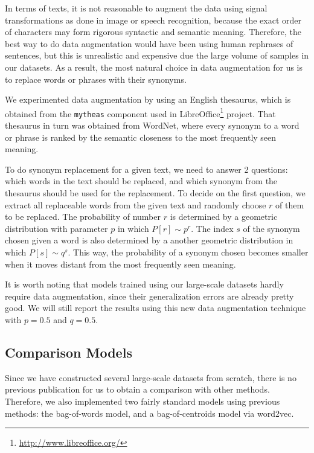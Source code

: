 \documentclass{article}
\begin{document}
\begin{CJK}{UTF8}{gbsn}
In terms of texts, it is not reasonable to augment the data using signal transformations as done in image or speech recognition, because the exact order of characters may form rigorous syntactic and semantic meaning. Therefore, the best way to do data augmentation would have been using human rephrases of sentences, but this is unrealistic and expensive due the large volume of samples in our datasets. As a result, the most natural choice in data augmentation for us is to replace words or phrases with their synonyms.

We experimented data augmentation by using an English thesaurus, which is obtained from the \texttt{mytheas} component used in LibreOffice\footnote{\url{http://www.libreoffice.org/}} project. That thesaurus in turn was obtained from WordNet\cite{F05}, where every synonym to a word or phrase is ranked by the semantic closeness to the most frequently seen meaning.

To do synonym replacement for a given text, we need to answer 2 questions: which words in the text should be replaced, and which synonym from the thesaurus should be used for the replacement. To decide on the first question, we extract all replaceable words from the given text and randomly choose \(r\) of them to be replaced. The probability of number \(r\) is determined by a geometric distribution with parameter \(p\) in which \(P[r] \sim p^r\). The index \(s\) of the synonym chosen given a word is also determined by a another geometric distribution in which \(P[s] \sim q^s\). This way, the probability of a synonym chosen becomes smaller when it moves distant from the most frequently seen meaning.

It is worth noting that models trained using our large-scale datasets hardly require data augmentation, since their generalization errors are already pretty good. We will still report the results using this new data augmentation technique with \(p = 0.5\) and \(q = 0.5\).

\subsection{Comparison Models}

Since we have constructed several large-scale datasets from scratch, there is no previous publication for us to obtain a comparison with other methods. Therefore, we also implemented two fairly standard models using previous methods: the bag-of-words model, and a bag-of-centroids model via word2vec\cite{MSCCD13}.


\end{CJK}
\end{document}
